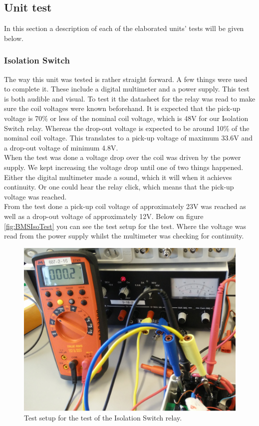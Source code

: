 \subsection{Unit test}
In this section a description of each of the elaborated units' tests will be given below. 

\subsubsection{Isolation Switch}
The way this unit was tested is rather straight forward. A few things were used to complete it. These include a digital multimeter and a power supply. This test is both audible and visual. To test it the datasheet\cite{BMSRelay} for the relay was read to make sure the coil voltages were known beforehand. It is expected that the pick-up voltage is 70\% or less of the nominal coil voltage, which is 48V for our Isolation Switch relay. Whereas the drop-out voltage is expected to be around 10\% of the nominal coil voltage. This translates to a pick-up voltage of maximum 33.6V and a drop-out voltage of minimum 4.8V.\\
When the test was done a voltage drop over the coil was driven by the power supply. We kept increasing the voltage drop until one of two things happened. Either the digital multimeter made a sound, which it will when it achieves continuity. Or one could hear the relay click, which means that the pick-up voltage was reached.\\
From the test done a pick-up coil voltage of approximately 23V was reached as well as a drop-out voltage of approximately 12V. Below on figure \vref{fig:BMSIsoTest} you can see the test setup for the test. Where the voltage was read from the power supply whilst the multimeter was checking for continuity. 

\begin{figure}[H]
	\centering
	\includegraphics[width=1.0\linewidth]{Hardware/Pictures/BMSIsoTest}
	\caption[Empty]{Test setup for the test of the Isolation Switch relay.}
	\label{fig:BMSIsoTest}
\end{figure}

